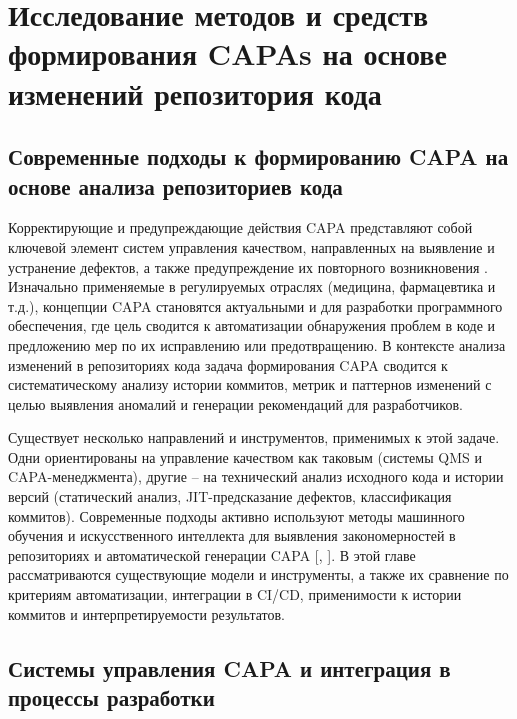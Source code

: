 \chapter{Исследование методов и средств  формирования CAPAs на основе изменений репозитория кода} \label{ch1}

\section{Современные подходы к формированию CAPA на основе анализа репозиториев кода} \label{ch1:sec1}

Корректирующие и предупреждающие действия CAPA представляют собой ключевой элемент систем управления качеством, направленных на выявление и устранение дефектов, а также предупреждение их повторного возникновения \cite{FDA}. Изначально применяемые в регулируемых отраслях (медицина, фармацевтика и т.д.), концепции CAPA становятся актуальными и для разработки программного обеспечения, где цель сводится к автоматизации обнаружения проблем в коде и предложению мер по их исправлению или предотвращению. В контексте анализа изменений в репозиториях кода задача формирования CAPA сводится к систематическому анализу истории коммитов, метрик и паттернов изменений с целью выявления аномалий и генерации рекомендаций для разработчиков.

Существует несколько направлений и инструментов, применимых к этой задаче. Одни ориентированы на управление качеством как таковым (системы QMS и CAPA-менеджмента), другие – на технический анализ исходного кода и истории версий (статический анализ, JIT-предсказание дефектов, классификация коммитов). Современные подходы активно используют методы машинного обучения и искусственного интеллекта для выявления закономерностей в репозиториях и автоматической генерации CAPA [\cite{Bugayenko2022}, \cite{Commit-classification}]. В этой главе рассматриваются существующие модели и инструменты, а также их сравнение по критериям автоматизации, интеграции в CI/CD, применимости к истории коммитов и интерпретируемости результатов.

\section{Системы управления CAPA и интеграция в процессы разработки} \label{ch1:sec2}


